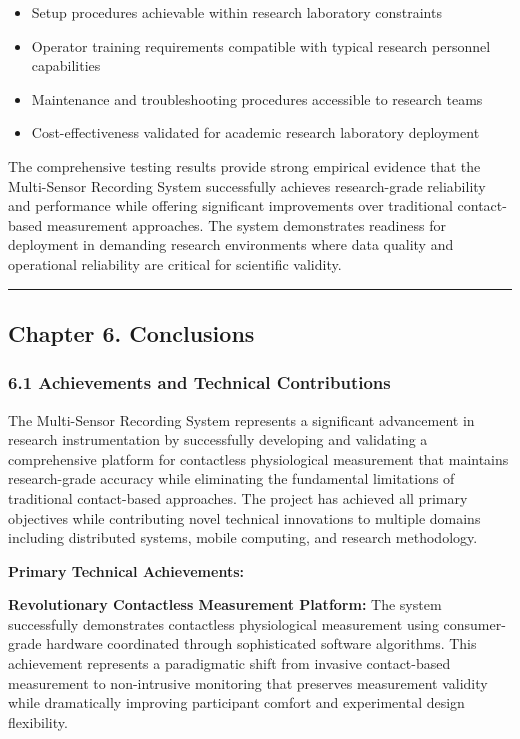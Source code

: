 \documentclass[12pt,a4paper]{report}
\begin{document}
\begin{itemize}
\item Setup procedures achievable within research laboratory constraints
\item Operator training requirements compatible with typical research personnel capabilities
\item Maintenance and troubleshooting procedures accessible to research teams
\item Cost-effectiveness validated for academic research laboratory deployment

\end{itemize}
The comprehensive testing results provide strong empirical evidence that the Multi-Sensor Recording System successfully
achieves research-grade reliability and performance while offering significant improvements over traditional
contact-based measurement approaches. The system demonstrates readiness for deployment in demanding research
environments where data quality and operational reliability are critical for scientific validity.

\hrule

\subsection{Chapter 6. Conclusions}

\subsubsection{6.1 Achievements and Technical Contributions}

The Multi-Sensor Recording System represents a significant advancement in research instrumentation by successfully
developing and validating a comprehensive platform for contactless physiological measurement that maintains
research-grade accuracy while eliminating the fundamental limitations of traditional contact-based approaches. The
project has achieved all primary objectives while contributing novel technical innovations to multiple domains including
distributed systems, mobile computing, and research methodology.

\textbf{Primary Technical Achievements:}

\textbf{Revolutionary Contactless Measurement Platform:}
The system successfully demonstrates contactless physiological measurement using consumer-grade hardware coordinated
through sophisticated software algorithms. This achievement represents a paradigmatic shift from invasive contact-based
measurement to non-intrusive monitoring that preserves measurement validity while dramatically improving participant
comfort and experimental design flexibility.
\end{document}
